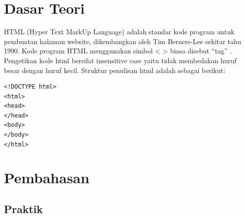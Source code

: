 \documentclass[a4paper,12pt]{article}
\begin{document}
\section{Dasar Teori}
HTML (Hyper Text MarkUp Language) adalah standar kode program untuk
pembuatan halaman website, dikembangkan oleh Tim Berners-Lee sekitar tahu 1990.
Kode program HTML menggunakan simbol < > biasa disebut “tag” . Pengetikan kode
html bersifat insensitive case yaitu tidak membedakan huruf besar dengan huruf kecil.
Struktur penulisan html adalah sebagai berikut:
\begin{lstlisting}[language=HTML5]
<!DOCTYPE html>
<html>
<head>
</head>
<body>
</body>
</html>
\end{lstlisting}

\newpage

\section{Pembahasan}
\subsection{Praktik}
\end{document}
